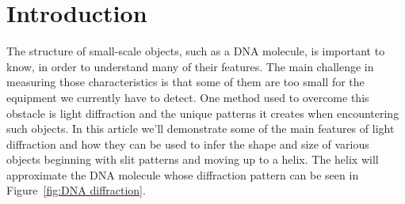 \section{Introduction}\label{sec:introduction}
The structure of small-scale objects, such as a DNA molecule, is important to know, in order to understand many of their features.
The main challenge in measuring those characteristics is that some of them are too small for the equipment we currently have to detect.
One method used to overcome this obstacle is light diffraction and the unique patterns it creates when encountering such objects.
In this article we'll demonstrate some of the main features of light diffraction and how they can be used to infer the shape and size of various objects beginning with slit patterns and moving up to a helix.
The helix will approximate the DNA molecule whose diffraction pattern can be seen in Figure~\ref{fig:DNA diffraction}.



